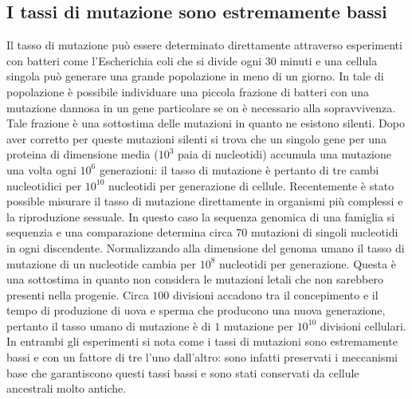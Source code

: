 \subsection{I tassi di mutazione sono estremamente bassi}
Il tasso di mutazione pu\`o essere determinato direttamente attraverso esperimenti con batteri come l'Escherichia coli che si divide ogni $30$ minuti e una cellula singola pu\`o generare
una grande popolazione in meno di un giorno. In tale di popolazione \`e possibile individuare una piccola frazione di batteri con una mutazione dannosa in un gene particolare se on
\`e necessario alla sopravvivenza. Tale frazione \`e una sottostima delle mutazioni in quanto ne esistono silenti. Dopo aver corretto per queste mutazioni silenti si trova che un singolo
gene per una proteina di dimensione media ($10^3$ paia di nucleotidi) accumula una mutazione una volta ogni $10^6$ generazioni: il tasso di mutazione \`e pertanto di tre cambi 
nucleotidici per $10^{10}$ nucleotidi per generazione di cellule. Recentemente \`e stato possible misurare il tasso di mutazione direttamente in organismi pi\`u complessi e la 
riproduzione sessuale. In questo caso la sequenza genomica di una famiglia si sequenzia e una comparazione determina circa $70$ mutazioni di singoli nucleotidi in ogni discendente. 
Normalizzando alla dimensione del genoma umano il tasso di mutazione di un nucleotide cambia per $10^8$ nucleotidi per generazione. Questa \`e una sottostima in quanto non considera le 
mutazioni letali che non sarebbero presenti nella progenie. Circa $100$ divisioni accadono tra il concepimento e il tempo di produzione di uova e sperma che producono una nuova 
generazione, pertanto il tasso umano di mutazione \`e di $1$ mutazione per $10^{10}$ divisioni cellulari. In entrambi gli esperimenti si nota come i tassi di mutazioni sono estremamente
bassi e con un fattore di tre l'uno dall'altro: sono infatti preservati i meccanismi base che garantiscono questi tassi bassi e sono stati conservati da cellule ancestrali molto antiche.
